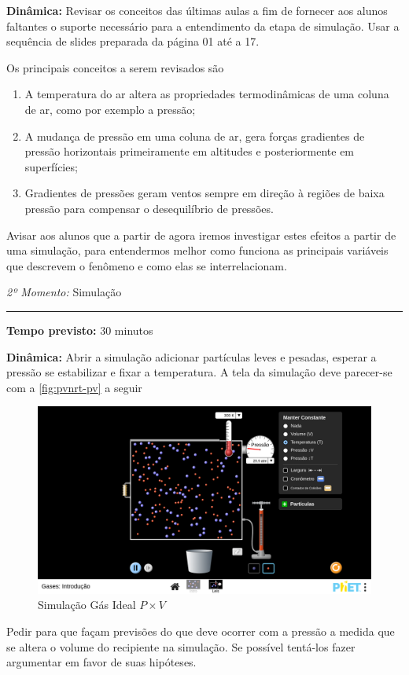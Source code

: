 \noindent\textbf{Dinâmica:} Revisar os conceitos das últimas aulas a fim de fornecer aos alunos faltantes o suporte necessário para a entendimento da etapa de simulação. Usar a sequência de slides preparada da página 01 até a 17.

Os principais conceitos a serem revisados são
\begin{enumerate}[label=\alph *)]
	\item A temperatura do ar altera as propriedades termodinâmicas de uma coluna de ar, como por exemplo a pressão;
	\item A mudança de pressão em uma coluna de ar, gera forças gradientes de pressão horizontais primeiramente em altitudes e posteriormente em superfícies;
	\item Gradientes de pressões geram ventos sempre em direção à regiões de baixa pressão para compensar o desequilíbrio de pressões.
\end{enumerate}

Avisar aos alunos que a partir de agora iremos investigar estes efeitos a partir de uma simulação, para entendermos melhor como funciona as principais variáveis que descrevem o fenômeno e como elas se interrelacionam.
\vspace{50pt}
\par\noindent\emph{2º Momento:} Simulação
\par\noindent\rule{.3\textwidth}{.5pt}    
\par\noindent\textbf{Tempo previsto:} 30 minutos

\noindent\textbf{Dinâmica:} Abrir a simulação adicionar partículas leves e pesadas, esperar a pressão se estabilizar e fixar a temperatura. A tela da simulação deve parecer-se com a \autoref{fig:pvnrt-pv} a seguir
\setlength\intextsep{0pt}
\begin{figure}
	\centering
	\includegraphics[width=.5\textwidth]{assets/pvnrt-pv.png}
	\caption{Simulação Gás Ideal $P \times V$}
	\label{fig:pvnrt-pv}
\end{figure}
Pedir para que façam previsões do que deve ocorrer com a pressão a medida que se altera o volume do recipiente na simulação. Se possível tentá-los fazer argumentar em favor de suas hipóteses.

